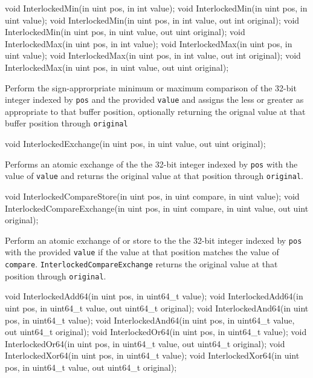 \begin{HLSL}
   void InterlockedMin(in uint pos, in int value);
   void InterlockedMin(in uint pos, in uint value);
   void InterlockedMin(in uint pos, in int value, out int original);
   void InterlockedMin(in uint pos, in uint value, out uint original);
   void InterlockedMax(in uint pos, in int value);
   void InterlockedMax(in uint pos, in uint value);
   void InterlockedMax(in uint pos, in int value, out int original);
   void InterlockedMax(in uint pos, in uint value, out uint original);
\end{HLSL}

Perform the sign-approrpriate minimum or maximum comparison of the 32-bit integer indexed by \texttt{pos}
and the provided \texttt{value} and assigns the less or greater as appropriate to that buffer position,
optionally returning the orignal value at that buffer position through \texttt{original}

\begin{HLSL}
   void InterlockedExchange(in uint pos, in uint value, out uint original);
\end{HLSL}

Performs an atomic exchange of the the 32-bit integer indexed by \texttt{pos} with
the value of \texttt{value} and returns the original value at that position through \texttt{original}.

\begin{HLSL}
   void InterlockedCompareStore(in uint pos, in uint compare, in uint value);
   void InterlockedCompareExchange(in uint pos, in uint compare, in uint value,
                                    out uint original);
\end{HLSL}

Perform an atomic exchange of or store to the the 32-bit integer indexed by \texttt{pos}
with the provided \texttt{value} if the value at that position matches the value of \texttt{compare}.
\texttt{InterlockedCompareExchange} returns the original value at that position through \texttt{original}.

\begin{HLSL}
   void InterlockedAdd64(in uint pos, in uint64_t value);
   void InterlockedAdd64(in uint pos, in uint64_t value, out uint64_t original);
   void InterlockedAnd64(in uint pos, in uint64_t value);
   void InterlockedAnd64(in uint pos, in uint64_t value, out uint64_t original);
   void InterlockedOr64(in uint pos, in uint64_t value);
   void InterlockedOr64(in uint pos, in uint64_t value, out uint64_t original);
   void InterlockedXor64(in uint pos, in uint64_t value);
   void InterlockedXor64(in uint pos, in uint64_t value, out uint64_t original);
\end{HLSL}

